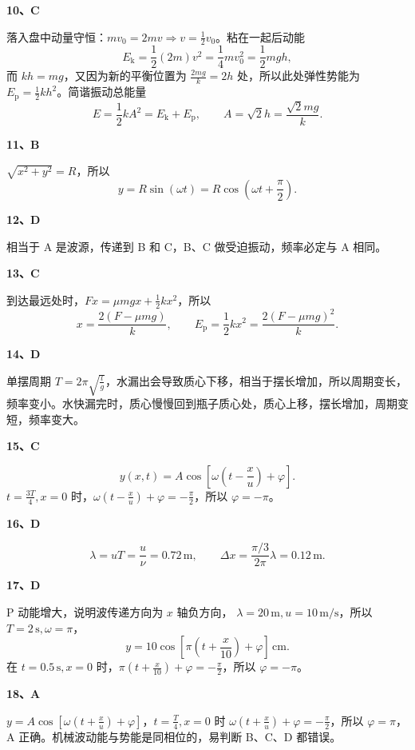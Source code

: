 \documentclass[UTF8,zihao=5,fontset=none,a4paper]{ctexart}
\newcounter{question}
\newcommand{\ans}[2]{\par\Needspace{4\baselineskip}\textbf{#1、#2}\par}
\newenvironment{questionblock}{\par\addvspace{5pt}\noindent
  \begin{minipage}{\linewidth}\setlength{\parskip}{4pt}}
  {\end{minipage}\par\addvspace{5pt}}
\begin{document}
\begin{questionblock}
\ans{10}{C}
落入盘中动量守恒：$mv_0=2mv\Rightarrow v=\frac12v_0$。粘在一起后动能
\[
E_{\mathrm k}=\frac12(2m)v^2=\frac14mv_0^2=\frac12mgh,
\]
而 $kh=mg$，又因为新的平衡位置为 $\frac{2mg}k=2h$ 处，所以此处弹性势能为 $E_{\mathrm p}=\frac12kh^2$。简谐振动总能量
\[
E=\frac12kA^2=E_{\mathrm k}+E_{\mathrm p},
\qquad A=\sqrt2h=\frac{\sqrt2mg}k.
\]
\end{questionblock}
\begin{questionblock}
\ans{11}{B}
$\sqrt{x^2+y^2}=R$，所以
\[
y=R\sin(\omega t)=R\cos\left(\omega t+\frac\pi2\right).
\]
\end{questionblock}
\begin{questionblock}
\ans{12}{D}
相当于 A 是波源，传递到 B 和 C，B、C 做受迫振动，频率必定与 A 相同。
\end{questionblock}
\begin{questionblock}
\ans{13}{C}
到达最远处时，$Fx=\mu mgx+\frac12kx^2$，所以
\[
x=\frac{2(F-\mu mg)}k,\qquad
E_{\mathrm p}=\frac12kx^2=\frac{2(F-\mu mg)^2}k.
\]
\end{questionblock}
\begin{questionblock}
\ans{14}{D}
单摆周期 $T=2\pi\sqrt{\frac lg}$，水漏出会导致质心下移，相当于摆长增加，所以周期变长，频率变小。水快漏完时，质心慢慢回到瓶子质心处，质心上移，摆长增加，周期变短，频率变大。
\end{questionblock}
\begin{questionblock}
\ans{15}{C}

\[
y(x,t)=A\cos\left[\omega\left(t-\frac xu\right)+\varphi\right].
\]
$t=\frac{3T}4,x=0$ 时，$\omega(t-\frac xu)+\varphi=-\frac\pi2$，所以 $\varphi=-\pi$。
\end{questionblock}
\begin{questionblock}
\ans{16}{D}

\[
\lambda=uT=\frac u\nu=0.72\,\mathrm m,\qquad
\Delta x=\frac{\pi/3}{2\pi}\lambda=0.12\,\mathrm m.
\]
\end{questionblock}
\begin{questionblock}
\ans{17}{D}
P 动能增大，说明波传递方向为 $x$ 轴负方向，
$\lambda=20\,\mathrm m,u=10\,\mathrm{m/s}$，所以 $T=2\,\mathrm s,\omega=\pi$，
\[
y=10\cos\left[\pi\left(t+\frac x{10}\right)+\varphi\right]\,\mathrm{cm}.
\]
在 $t=0.5\,\mathrm s,x=0$ 时，$\pi(t+\frac x{10})+\varphi=-\frac\pi2$，所以 $\varphi=-\pi$。
\end{questionblock}
\begin{questionblock}
\ans{18}{A}
$y=A\cos[\omega(t+\frac xu)+\varphi]$，$t=\frac T4,x=0$ 时
$\omega(t+\frac xu)+\varphi=-\frac\pi2$，所以 $\varphi=\pi$，A 正确。机械波动能与势能是同相位的，易判断 B、C、D 都错误。
\end{questionblock}
\end{document}
